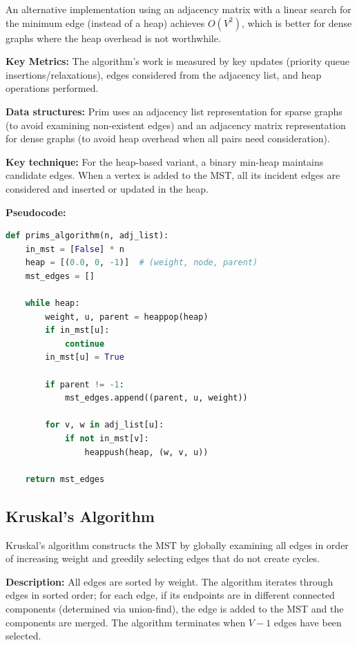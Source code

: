 \documentclass{labreport}
\begin{document}
An alternative implementation using an adjacency matrix with a linear search for the minimum edge (instead of a heap) achieves $O(V^2)$, which is better for dense graphs where the heap overhead is not worthwhile.

\textbf{Key Metrics:} The algorithm's work is measured by key updates (priority queue insertions/relaxations), edges considered from the adjacency list, and heap operations performed.

\textbf{Data structures:} Prim uses an adjacency list representation for sparse graphs (to avoid examining non-existent edges) and an adjacency matrix representation for dense graphs (to avoid heap overhead when all pairs need consideration).

\textbf{Key technique:} For the heap-based variant, a binary min-heap maintains candidate edges. When a vertex is added to the MST, all its incident edges are considered and inserted or updated in the heap.

\textbf{Pseudocode:}
\begin{lstlisting}[language=Python]
def prims_algorithm(n, adj_list):
    in_mst = [False] * n
    heap = [(0.0, 0, -1)]  # (weight, node, parent)
    mst_edges = []
    
    while heap:
        weight, u, parent = heappop(heap)
        if in_mst[u]:
            continue
        in_mst[u] = True
        
        if parent != -1:
            mst_edges.append((parent, u, weight))
        
        for v, w in adj_list[u]:
            if not in_mst[v]:
                heappush(heap, (w, v, u))
    
    return mst_edges
\end{lstlisting}

    \subsection{Kruskal's Algorithm}

    Kruskal's algorithm constructs the MST by globally examining all edges in order of increasing weight and greedily selecting edges that do not create cycles.

    \textbf{Description:} All edges are sorted by weight. The algorithm iterates through edges in sorted order; for each edge, if its endpoints are in different connected components (determined via union-find), the edge is added to the MST and the components are merged. The algorithm terminates when $V - 1$ edges have been selected.
\end{document}

